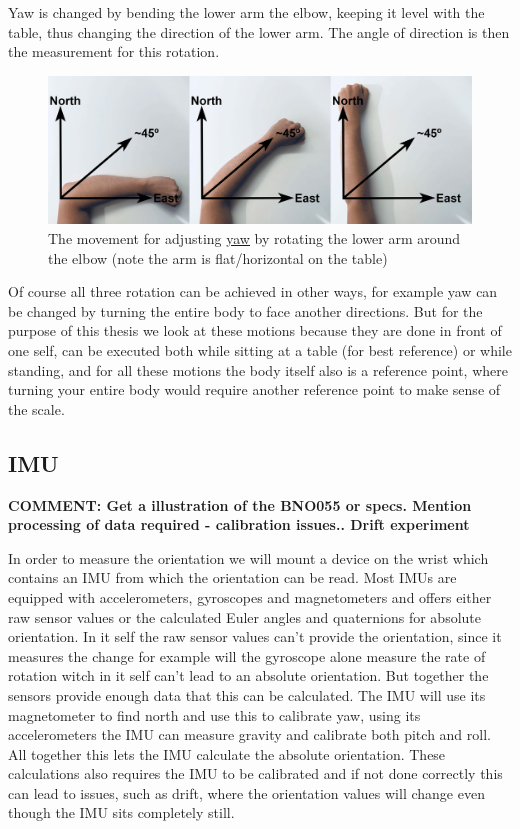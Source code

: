 Yaw is changed by bending the lower arm the elbow, keeping it level with the table, thus changing the direction of the lower arm. The angle of direction is then the measurement for this rotation.

\begin{figure}[h!]
    \centering
    \includegraphics[width=1\textwidth]{figures/yaw.png}
    \caption{The movement for adjusting \underline{yaw} by rotating the lower arm around the elbow (note the arm is flat/horizontal on the table)}
    \label{yaw}
\end{figure}

Of course all three rotation can be achieved in other ways, for example yaw can be changed by turning the entire body to face another directions. But for the purpose of this thesis we look at these motions because they are done in front of one self, can be executed both while sitting at a table (for best reference) or while standing, and for all these motions the body itself also is a reference point, where turning your entire body would require another reference point to make sense of the scale.

\subsection{IMU}
\textbf{COMMENT: Get a illustration of the BNO055 or specs. Mention processing of data required - calibration issues.. Drift experiment}

In order to measure the orientation we will mount a device on the wrist which contains an IMU from which the orientation can be read. Most IMUs are equipped with accelerometers, gyroscopes and magnetometers and offers either raw sensor values or the calculated Euler angles and quaternions for absolute orientation. In it self the raw sensor values can't provide the orientation, since it measures the change for example will the gyroscope alone measure the rate of rotation witch in it self can't lead to an absolute orientation. But together the sensors provide enough data that this can be calculated. The IMU will use its magnetometer to find north and use this to calibrate yaw, using its accelerometers the IMU can measure gravity and calibrate both pitch and roll. All together this lets the IMU calculate the absolute orientation. These calculations also requires the IMU to be calibrated and if not done correctly this can lead to issues, such as drift, where the orientation values will change even though the IMU sits completely still. 

